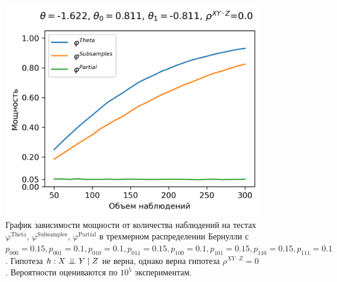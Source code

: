 \begin{figure}[H]
    \centering
    \includegraphics[scale=0.6]{images/graph4.png}
    \caption{График зависимости мощности от количества наблюдений
    на тестах $\varphi^{\text{Theta}}$, $\varphi^{\text{Subsamples}}$, $\varphi^{\text{Partial}}$
    в трехмерном распределении Бернулли с $p_{000}=0.15, p_{001}=0.1, 
    p_{010}=0.1, p_{011}=0.15,
    p_{100}=0.1, p_{101}=0.15, p_{110}=0.15, p_{111}=0.1$. 
    Гипотеза $h: X \perp\!\!\!\perp Y \mid Z$ не верна, однако верна гипотеза $\rho^{XY\cdot Z}=0$.
    Вероятности оцениваются по $10^5$ экспериментам.} \label{fig:4}
\end{figure}

